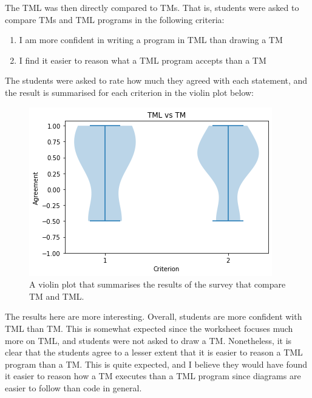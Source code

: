 The TML was then directly compared to TMs. That is, students were asked to compare TMs and TML programs in the following criteria:
\begin{enumerate}
    \item I am more confident in writing a program in TML than drawing a TM
    \item I find it easier to reason what a TML program accepts than a TM
\end{enumerate}
The students were asked to rate how much they agreed with each statement, and the result is summarised for each criterion in the violin plot below:
\begin{figure}[H]
    \centering
    \includegraphics[scale=0.75]{data/tml-v-tm.png}
    \caption{A violin plot that summarises the results of the survey that compare TM and TML.}
\end{figure}
\noindent The results here are more interesting. Overall, students are more confident with TML than TM. This is somewhat expected since the worksheet focuses much more on TML, and students were not asked to draw a TM. Nonetheless, it is clear that the students agree to a lesser extent that it is easier to reason a TML program than a TM. This is quite expected, and I believe they would have found it easier to reason how a TM executes than a TML program since diagrams are easier to follow than code in general. 

